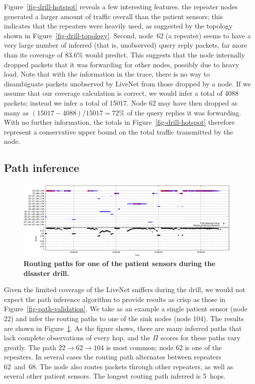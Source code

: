 Figure~\ref{fig-drill-hotspot} reveals a few interesting features. the repeater nodes
generated a larger amount of traffic overall than the patient
sensors; this indicates that the repeaters were heavily used, as
suggested by the topology shown in Figure~\ref{fig-drill-topology}. 
Second, node~62 (a repeater) seems to have a very large number of
inferred (that is, unobserved) query reply packets, far more than its
coverage of 83.6\% would predict. This suggests that the node 
internally dropped packets that it was forwarding
for other nodes, possibly due to heavy load. Note that with 
the information in the trace, there is no way to disambiguate packets 
unobserved by LiveNet from those dropped by a node. If we assume
that our coverage calculation is correct, we would infer
a total of 4088 packets; instead we infer a total of 15017. Node 62 may have
then dropped as many as $(15017-4088)/15017 = 72\%$ of the query 
replies it was forwarding. With no further information, 
the totals in Figure~\ref{fig-drill-hotspot} therefore represent 
a conservative upper bound on the total traffic transmitted by the node.

\subsection{Path inference}

\begin{figure}[t]
\begin{center}
\includegraphics[width=0.9\hsize]{./resources/livenet-sensys07/figs/pathinference/drill/22_104/alpha_01/22_104_route_change_plot.pdf}
\end{center}
\caption{\small {\bf Routing paths for one of the patient
sensors during the disaster drill.}}
\label{fig-drill-path}
\end{figure}

Given the limited coverage of the LiveNet sniffers during the drill,
we would not expect the path inference algorithm to provide results
as crisp as those in Figure~\ref{fig-path-validation}. We take as an
example a single patient sensor (node 22) and infer the routing paths to one of
the sink nodes (node 104). 
The results are shown in Figure~\ref{fig-drill-path}.
As the figure shows, there are many inferred paths that lack complete
observations of every hop, and the $\Pi$ scores for these paths vary
greatly. The path $22 \rightarrow 62
\rightarrow 104$ is most common; node 62 is one of the repeaters.
In several cases the routing path alternates between repeaters 62~and~68.
The node also routes packets through other repeaters, as well as 
several other patient sensors. The longest routing path inferred is 5~hops. 

